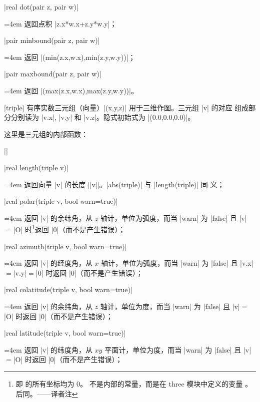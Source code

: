 \documentclass{ctexbook}
\makeatletter
\newenvironment{funclist}{\trivlist
  \parindent=0pt
\item[]
  \def\item{\medskip\par\leftskip=0pt}
  \def\go{\par\leftskip=4em}}
{\endtrivlist}
\newenvironment{typelist}{\itemize
  \let\old@item\@item
  \def\@item[##1]{\expandafter\old@item[\ttfamily\color{type!50!black}##1]}}
{\enditemize}
\newcommand*\prgname[1]{\textsf{#1}}
\newcommand\transnote[1]{\footnote{#1——译者注}}
\makeatother
\begin{document}
\begin{typelist}
\begin{funclist}
\item |real dot(pair z, pair w)| \go
  返回点积 |z.x*w.x+z.y*w.y|；

\item |pair minbound(pair z, pair w)| \go
  返回 |(min(z.x,w.x),min(z.y,w.y))|；

\item |pair maxbound(pair z, pair w)| \go
  返回 |(max(z.x,w.x),max(z.y,w.y))|。
\end{funclist}

\item[triple] 有序实数三元组（向量）|(x,y,z)| 用于三维作图。三元组 |v| 的对应
组成部分分别读为 |v.x|, |v.y| 和 |v.z|。隐式初始式为 |(0.0,0.0,0.0)|。

这里是三元组的内部函数：
\begin{funclist}
\item |real length(triple v)| \go
  返回向量 |v| 的长度 $\vert$|v|$\vert$。|abs(triple)| 与 |length(triple)| 同
  义；

\item |real polar(triple v, bool warn=true)| \go
  返回 |v| 的余纬角，从 $z$ 轴计，单位为弧度，而当 |warn| 为 |false| 且
  |v|${}={}$|O| 时\transnote{即  的所有坐标均为 0。
   不是内部的常量，而是在 \prgname{three} 模块中定义的变量
  \inlinecode{(0,0,0)}。后同。}返回 |0|（而不是产生错误）；

\item |real azimuth(triple v, bool warn=true)| \go
  返回 |v| 的经度角，从 $x$ 轴计，单位为弧度，而当 |warn| 为 |false| 且
  |v.x|${}={}$|v.y|${}={}$|0| 时返回 |0|（而不是产生错误）；

\item |real colatitude(triple v, bool warn=true)| \go
  返回 |v| 的余纬角，从 $z$ 轴计，单位为度，而当 |warn| 为 |false| 且
  |v|${}={}$|O| 时返回 |0|（而不是产生错误）；

\item |real latitude(triple v, bool warn=true)| \go
  返回 |v| 的纬度角，从 $xy$ 平面计，单位为度，而当 |warn| 为 |false| 且
  |v|${}={}$|O| 时返回 |0|（而不是产生错误）；


\end{funclist}
\end{typelist}
\end{document}
